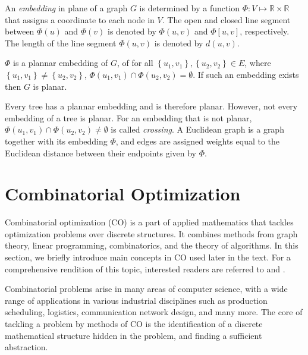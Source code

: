 An \emph{embedding} in plane of a graph $G$ is determined by a function $\Phi:V\mapsto\mathbb{R}\times\mathbb{R}$ that assigns a coordinate to each node in $V$. 
The open and closed line segment between $\Phi(u)$ and $\Phi(v)$ is denoted by $\Phi(u,v)$ and $\Phi\left[u,v\right]$, respectively.
The length of the line segment $\Phi(u,v)$ is denoted by $d(u,v)$.
\begin{definition}\label{def:planemb}
	$\Phi$ is a plannar embedding of $G$, of for all $\left\{u_1,v_1\right\},\left\{u_2,v_2\right\}\in E$, where $\left\{u_1,v_1\right\}\neq\left\{u_2,v_2\right\}$,
	$\Phi(u_1,v_1)\cap\Phi(u_2,v_2)=\emptyset$.
	If such an embedding exists then $G$ is planar.
\end{definition}
Every tree has a plannar embedding and is therefore planar.
However, not every embedding of a tree is planar. 
For an embedding that is not planar, $\Phi(u_1,v_1)\cap\Phi(u_2,v_2)\neq\emptyset$ is called \emph{crossing}.
A Euclidean graph is a graph together with its embedding $\Phi$, and edges are assigned weights equal to the Euclidean distance between their endpoints given by $\Phi$.

\section{Combinatorial Optimization}

Combinatorial optimization (CO) is a part of applied mathematics that tackles optimization problems over discrete structures.
It combines methods from graph theory, linear programming, combinatorics, and the theory of algorithms.
In this section, we briefly introduce main concepts in CO used later in the text.
For a comprehensive rendition of this topic, interested readers are referred to \cite{wolsey98} and \cite{nemhauser88}.

Combinatorial problems arise in many areas of computer science, with a wide range of applications in various industrial disciplines 
such as production scheduling, logistics, communication network design, and many more.
The core of tackling a problem by methods of CO is the identification of a discrete mathematical structure hidden in the problem,
and finding a sufficient abstraction.

